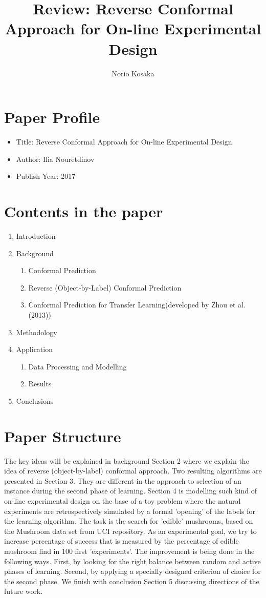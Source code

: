 \documentclass[10pt,a4paper]{article}
\author{Norio Kosaka}
\title{Review: Reverse Conformal Approach for On-line Experimental Design}
\begin{document}
\maketitle

\section{Paper Profile}
\begin{itemize}
\item Title: Reverse Conformal Approach for On-line Experimental Design
\item Author: Ilia Nouretdinov
\item Publish Year: 2017
\end{itemize}

\section{Contents in the paper}
\begin{enumerate}
\item Introduction
\item Background
\begin{enumerate}
    \item Conformal Prediction
    \item Reverse (Object-by-Label) Conformal Prediction
    \item Conformal Prediction for Transfer Learning(developed by Zhou et al. (2013)\cite{zhou2013conformity})
\end{enumerate}
\item Methodology
\item Application
\begin{enumerate}
    \item Data Processing and Modelling
    \item Results
\end{enumerate}
\item Conclusions
\end{enumerate}

\section{Paper Structure}
The key ideas will be explained in background Section 2 where we explain the idea of reverse (object-by-label) conformal approach. Two resulting algorithms are presented in Section 3. They are different in the approach to selection of an instance during the second phase of learning. Section 4 is modelling such kind of on-line experimental design on the base of a toy problem where the natural experiments are retrospectively simulated by a formal ’opening’ of the labels for the learning algorithm. The task is the search for ’edible’ mushrooms, based on the Mushroom data set from UCI repository. As an experimental goal, we try to increase percentage of success that is measured by the percentage of edible mushroom find in 100 first ’experiments’. The improvement is being done in the following ways. First, by looking for the right balance between random and active phases of learning. Second, by applying a specially designed criterion of choice for the second phase. We finish with conclusion Section 5 discussing directions of the future work.
\end{document}
